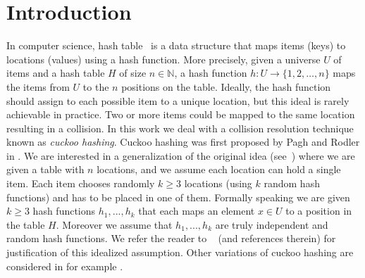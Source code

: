 \section{Introduction}
In computer science, hash table~\cite{bookC:09} is a data structure that maps items (keys) to locations (values) using a hash function. More precisely, given a universe $U$ of items and a hash table $H$ of size $n \in \mathbb{N}$, a hash function
$h : U \rightarrow \{1,2,\ldots, n\}$ maps the items from $U$ to the $n$ positions on the table. Ideally, the hash function should assign to each possible item to a unique location, but this ideal is rarely achievable in practice. Two or more items could be mapped to the same location resulting in a collision. In this work we deal with a collision resolution technique known as \emph{cuckoo hashing}.  Cuckoo hashing was first proposed by Pagh and Rodler in \cite{inp:pr01}. We are interested in a generalization of the original idea (see~\cite{inc:fpss03}) where we are given a table with $n$ locations, and we assume each location can hold a single item. Each item chooses randomly $k\ge 3$ locations (using $k$ random hash functions) and has to be placed in one of them.  Formally speaking we are given $k\ge3$ hash functions $h_1, . . . , h_k$
that each maps an element $x \in U$ to a position in the table $H$. 
Moreover we assume that $h_1, . . . , h_k$ are truly independent and random hash functions. We refer the reader to ~\cite{ms:08,d:09}  (and references therein) for justification of this idealized assumption. 
 Other variations of cuckoo hashing are considered in for example \cite{inp:ans:09,art:kmw09}.


